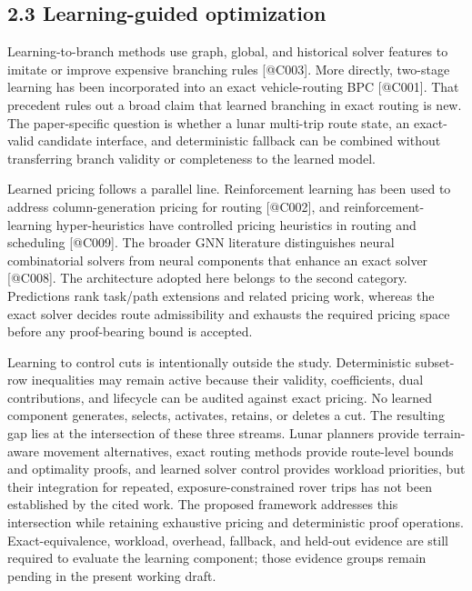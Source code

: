 \documentclass[
  11pt,
]{article}
\begin{document}
\hypertarget{learning-guided-optimization}{%
\subsection{2.3 Learning-guided
optimization}\label{learning-guided-optimization}}

Learning-to-branch methods use graph, global, and historical solver
features to imitate or improve expensive branching rules {[}@C003{]}.
More directly, two-stage learning has been incorporated into an exact
vehicle-routing BPC {[}@C001{]}. That precedent rules out a broad claim
that learned branching in exact routing is new. The paper-specific
question is whether a lunar multi-trip route state, an exact-valid
candidate interface, and deterministic fallback can be combined without
transferring branch validity or completeness to the learned model.

Learned pricing follows a parallel line. Reinforcement learning has been
used to address column-generation pricing for routing {[}@C002{]}, and
reinforcement-learning hyper-heuristics have controlled pricing
heuristics in routing and scheduling {[}@C009{]}. The broader GNN
literature distinguishes neural combinatorial solvers from neural
components that enhance an exact solver {[}@C008{]}. The architecture
adopted here belongs to the second category. Predictions rank task/path
extensions and related pricing work, whereas the exact solver decides
route admissibility and exhausts the required pricing space before any
proof-bearing bound is accepted.

Learning to control cuts is intentionally outside the study.
Deterministic subset-row inequalities may remain active because their
validity, coefficients, dual contributions, and lifecycle can be audited
against exact pricing. No learned component generates, selects,
activates, retains, or deletes a cut. The resulting gap lies at the
intersection of these three streams. Lunar planners provide
terrain-aware movement alternatives, exact routing methods provide
route-level bounds and optimality proofs, and learned solver control
provides workload priorities, but their integration for repeated,
exposure-constrained rover trips has not been established by the cited
work. The proposed framework addresses this intersection while retaining
exhaustive pricing and deterministic proof operations.
Exact-equivalence, workload, overhead, fallback, and held-out evidence
are still required to evaluate the learning component; those evidence
groups remain pending in the present working draft.
\end{document}
